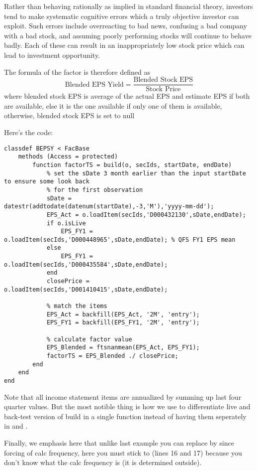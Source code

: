 \nopagebreak
{}
\begin{parchment}
\small\sffamily

Rather than behaving rationally as implied in standard financial theory, 
investors tend to make systematic cognitive errors which a truly objective investor can exploit. 
Such errors include overreacting to bad news, 
confusing a bad company with a bad stock, 
and assuming poorly performing stocks will continue to behave badly.  
Each of these can result in an inappropriately 
low stock price which can lead to investment opportunity.

The formula of the factor is therefore defined as
\[
    \text{Blended EPS Yield} = \frac{\text{Blended Stock EPS}}{\text{Stock Price}}
\]
where blended stock EPS is average of the actual EPS and estimate EPS if both are available,
else it is the one available if only one of them is available,
otherwise, blended stock EPS is set to null

Here's the code:
\begin{lstlisting}
classdef BEPSY < FacBase
    methods (Access = protected)
        function factorTS = build(o, secIds, startDate, endDate)
            % set the sDate 3 month earlier than the input startDate to ensure some look back
            % for the first observation
            sDate = datestr(addtodate(datenum(startDate),-3,'M'),'yyyy-mm-dd');
            EPS_Act = o.loadItem(secIds,'D000432130',sDate,endDate);
            if o.isLive
                EPS_FY1 = o.loadItem(secIds,'D000448965',sDate,endDate); % QFS FY1 EPS mean
            else            
                EPS_FY1 = o.loadItem(secIds,'D000435584',sDate,endDate);
            end
            closePrice = o.loadItem(secIds,'D001410415',sDate,endDate);
            
            % match the items
            EPS_Act = backfill(EPS_Act, '2M', 'entry');
            EPS_FY1 = backfill(EPS_FY1, '2M', 'entry');
            
            % calculate factor value
            EPS_Blended = ftsnanmean(EPS_Act, EPS_FY1);
            factorTS = EPS_Blended ./ closePrice;
        end
    end
end
\end{lstlisting}
Note that all income statement items are annualized by summing up last four quarter values. 
But the most notible thing is how we use  to differentiate live and back-test version of
build in a single  function
instead of having them seperately in  and .

Finally, we emphasis here that unlike last example you can replace  by 
since forcing of calc frequency,
here you must stick to  (lines 16 and 17)
because you don't know what the calc frequency is 
(it is determined outside).

\end{parchment}

